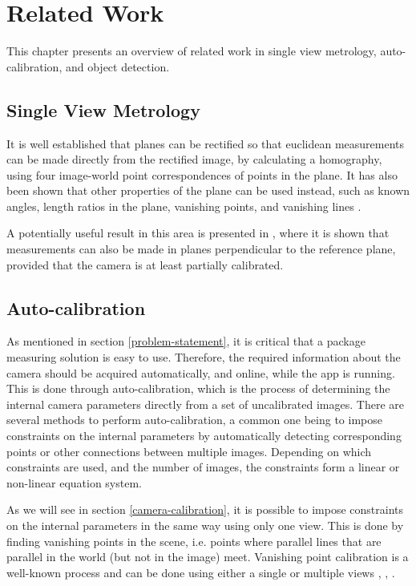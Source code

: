 \chapter{Related Work}
This chapter presents an overview of related work in single view metrology, auto-calibration, and object detection.

\section{Single View Metrology}
It is well established that planes can be rectified so that euclidean measurements can be made directly from the rectified image, by calculating a homography, using four image-world point correspondences of points in the plane. %
It has also been shown that other properties of the plane can be used instead, such as known angles, length ratios in the plane, vanishing points, and vanishing lines \cite{liebowitz1998metric} \cite{criminisi2000single}.

A potentially useful result in this area is presented in \cite{huang2004new}, where it is shown that measurements can also be made in planes perpendicular to the reference plane, provided that the camera is at least partially calibrated.

\section{Auto-calibration}
As mentioned in section \ref{problem-statement}, it is critical that a package measuring solution is easy to use.
Therefore, the required information about the camera should be acquired automatically, and online, while the app is running.
This is done through auto-calibration, which is the process of determining the internal camera parameters directly from a set of uncalibrated images.
There are several methods to perform auto-calibration, a common one being to impose constraints on the internal parameters by automatically detecting corresponding points or other connections between multiple images. 
Depending on which constraints are used, and the number of images, the constraints form a linear or non-linear equation system. \cite[458-469]{hartley-zisserman}

As we will see in section \ref{camera-calibration}, it is possible to impose constraints on the internal parameters in the same way using only one view.
This is done by finding vanishing points in the scene, i.e. points where parallel lines that are parallel in the world (but not in the image) meet.
Vanishing point calibration is a well-known process and can be done using either a single or multiple views \cite{guillou2000using}, \cite[195-226]{hartley-zisserman}, \cite{caprile1990using}.

